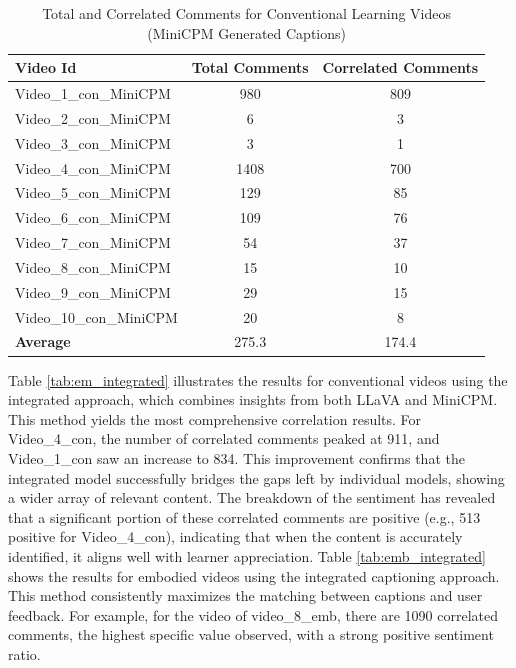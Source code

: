 \documentclass[12pt]{article}
\begin{document}
\begin{table}[H] %
    \centering
    \caption{Total and Correlated Comments for Conventional Learning Videos (MiniCPM Generated Captions)}
    \label{tab:con_minicpm}
    \begin{tabular}{lcc}
        \toprule
        \textbf{Video Id} & \textbf{Total Comments} & \textbf{Correlated Comments} \\
        \midrule
        Video\_1\_con\_MiniCPM  & 980  & 809 \\
        Video\_2\_con\_MiniCPM  & 6    & 3   \\
        Video\_3\_con\_MiniCPM  & 3    & 1   \\
        Video\_4\_con\_MiniCPM  & 1408 & 700 \\
        Video\_5\_con\_MiniCPM  & 129  & 85  \\
        Video\_6\_con\_MiniCPM  & 109  & 76  \\
        Video\_7\_con\_MiniCPM  & 54   & 37  \\
        Video\_8\_con\_MiniCPM  & 15   & 10  \\
        Video\_9\_con\_MiniCPM  & 29   & 15  \\
        Video\_10\_con\_MiniCPM & 20   & 8   \\
        \textbf{Average} & 275.3 & 174.4 \\
        \bottomrule
    \end{tabular}
\end{table}


Table \ref{tab:em_integrated} illustrates the results for conventional videos using the integrated approach, which combines insights from both LLaVA and MiniCPM. This method yields the most comprehensive correlation results. For Video\_4\_con, the number of correlated comments peaked at 911, and Video\_1\_con saw an increase to 834. This improvement confirms that the integrated model successfully bridges the gaps left by individual models, showing a wider array of relevant content. The breakdown of the sentiment has revealed that a significant portion of these correlated comments are positive (e.g., 513 positive for Video\_4\_con), indicating that when the content is accurately identified, it aligns well with learner appreciation. Table \ref{tab:emb_integrated} shows the results for embodied videos using the integrated captioning approach. This method consistently maximizes the matching between captions and user feedback. For example, for the video of video\_8\_emb, there are 1090 correlated comments, the highest specific value observed, with a strong positive sentiment ratio. %
\end{document}
